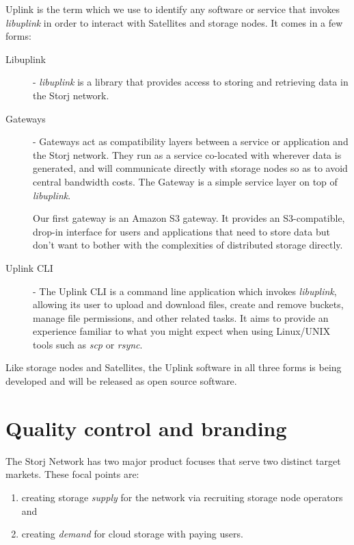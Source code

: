 \documentclass[8pt,fleqn,openany]{book}
\begin{document}
Uplink is the term which we use to identify any software or service that invokes {\em libuplink} in order to interact with Satellites and storage nodes. It comes
in a few forms:

\begin{description}
\item[Libuplink] - {\em libuplink} is a library that
  provides access to storing and retrieving data in the Storj network.

\item[Gateways] - Gateways act as compatibility layers between a service or
  application and the Storj network.
  They run as a service co-located with wherever data is generated, and will
  communicate directly with storage nodes so as to avoid central bandwidth
  costs.
  The Gateway is a simple service layer on top of {\em libuplink}.

  Our first gateway is an Amazon S3 gateway. It provides an S3-compatible,
  drop-in interface for users and applications that need to store data but
  don't want to bother with the complexities of distributed storage directly.

\item[Uplink CLI] - The Uplink CLI is a command line application which
  invokes {\em libuplink}, allowing its user to upload and download files,
  create and remove buckets, manage file permissions, and other related tasks.
  It aims to provide an experience familiar to what you might expect when
  using Linux/UNIX tools such as {\em scp} or {\em rsync}.
\end{description}

Like storage nodes and Satellites,
the Uplink software in all three forms is being developed and will be released as
open source software.

\section{Quality control and branding}\label{sec:qc}

The Storj Network has two major product focuses that serve two distinct
target markets. These focal points are:

\begin{enumerate}
\item creating storage {\em supply} for the network via recruiting storage node
  operators and
\item creating {\em demand} for cloud storage with paying users.
\end{enumerate}
\end{document}

